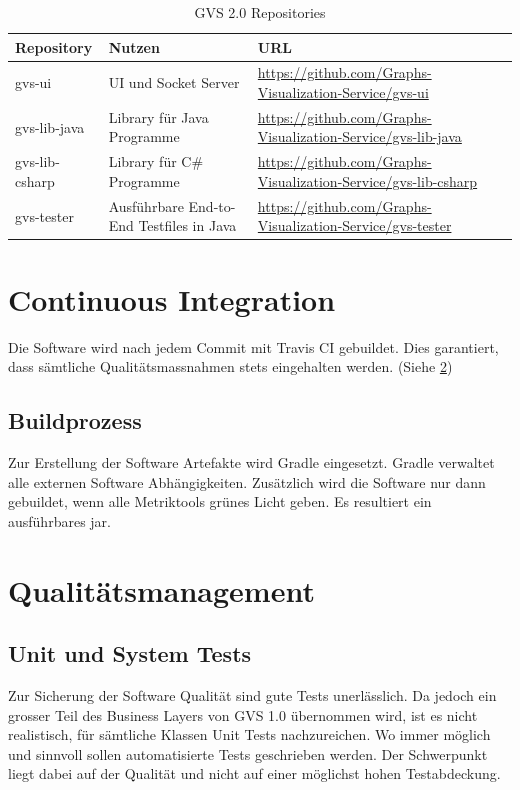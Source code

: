 \documentclass[11pt,a4paper,english,oneside]{book}
\numberwithin{equation}{chapter}
\begin{document}
	\begin{table}[h!]
		\centering
		\begin{tabularx}{\linewidth}{l l X}
			\toprule 
			Repository & Nutzen & URL \\
			\midrule
			gvs-ui & UI und Socket Server & \url{https://github.com/Graphs-Visualization-Service/gvs-ui}  \\
			gvs-lib-java & Library für Java Programme & \url{https://github.com/Graphs-Visualization-Service/gvs-lib-java} \\
			gvs-lib-csharp & Library für C\# Programme & \url{https://github.com/Graphs-Visualization-Service/gvs-lib-csharp} \\
			gvs-tester & Ausführbare End-to-End Testfiles in Java & \url{https://github.com/Graphs-Visualization-Service/gvs-tester} \\
			\bottomrule 
		\end{tabularx} 
		\caption{GVS 2.0 Repositories} 
		\label{tbl:repos}
	\end{table}
	
	\section{Continuous Integration}
	Die Software wird nach jedem Commit mit Travis CI \cite{travisci} gebuildet. Dies garantiert, dass sämtliche Qualitätsmassnahmen stets eingehalten werden. (Siehe \ref{sec:qualitymeasures})
	
	\subsection{Buildprozess}
	\label{sec:buildprocess}
	Zur Erstellung der Software Artefakte wird Gradle \cite{gradle} eingesetzt. Gradle verwaltet alle externen Software Abhängigkeiten. Zusätzlich wird die Software nur dann gebuildet, wenn alle Metriktools grünes Licht geben. Es resultiert ein ausführbares \gls{jar}.
	
	
	
	\section{Qualitätsmanagement}
	\label{sec:qualitymeasures}
	
	\subsection{Unit und System Tests}
	Zur Sicherung der Software Qualität sind gute Tests unerlässlich. Da jedoch ein grosser Teil des Business Layers von GVS 1.0 übernommen wird, ist es nicht realistisch, für sämtliche Klassen Unit Tests nachzureichen. Wo immer möglich und sinnvoll sollen automatisierte Tests geschrieben werden. Der Schwerpunkt liegt dabei auf der Qualität und nicht auf einer möglichst hohen Testabdeckung.
	
\end{document}
